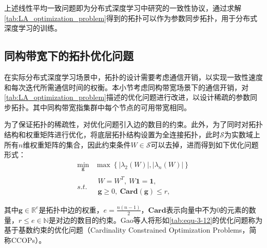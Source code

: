 上述线性平均一致问题即为分布式深度学习中研究的一致性协议，通过求解\autoref{tab:LA_optimization_problem}得到的拓扑可以作为参数同步拓扑，用于分布式深度学习的训练。

\subsection{同构带宽下的拓扑优化问题}\label{subsection3-2-2}

在实际分布式深度学习场景中，拓扑的设计需要考虑通信开销，以实现一致性速度和每次迭代所需通信时间的权衡。本小节考虑同构带宽场景下的通信开销，对\autoref{tab:LA_optimization_problem}描述的优化问题进行改进，以设计稀疏的参数同步拓扑。其中同构带宽指集群中每个节点的可用带宽相同。

为了保证拓扑的稀疏性，对优化问题引入边的数目的约束。此外，为了同时对拓扑结构和权重矩阵进行优化，将底层拓扑结构设置为全连接拓扑，此时$\mathcal{S}$为实数域上所有$n$维权重矩阵的集合，因此约束条件$W\in \mathcal{S}$可以去掉，进而得到如下优化问题形式：
\begin{equation}
    \label{tab:equ-3-12}
    \begin{matrix}
        \underset{\mathbf{g}}{\min}&		\max \left\{ \left| \lambda _2\left( W \right) \right|,\left| \lambda _n\left( W \right) \right| \right\}\\
        s.t.&		\begin{array}{c}
        W=W^T, \ W\mathbf{1}=\mathbf{1},\\
        \mathbf{g}\ge 0, \ \mathbf{Card}\left( \mathbf{g} \right) \le r,\\
    \end{array}\\
    \end{matrix}
\end{equation}
其中$\mathbf{g}\in \mathbb{R}^e$是拓扑中边的权重，$e=\frac{n\left( n-1 \right)}{2}$，$\mathbf{Card}$表示向量中不为0的元素的数量，$r\le e\in \mathbb{N}$是对边的数目的约束。Gao等人\cite{gao2011cardinality}将形如\autoref{tab:equ-3-12}的优化问题称为基于基数约束的优化问题（Cardinality Constrained Optimization Problems，简称CCOPs）。


